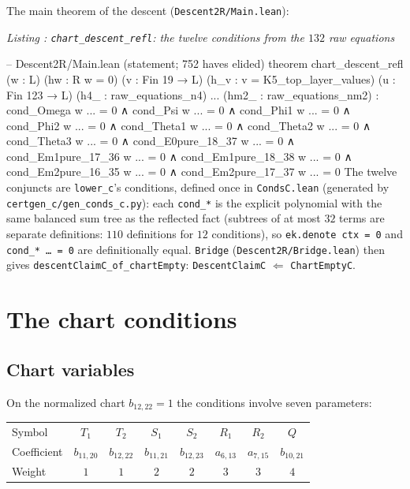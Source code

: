 \documentclass[a4paper,11pt]{article}
\newcounter{leanlisting}
\newenvironment{leanlisting}[2]{%
  \refstepcounter{leanlisting}\label{#2}%
  \begin{center}\textit{\small Listing \theleanlisting: #1}\end{center}%
  \Verbatim[breaklines=true,breakanywhere=true,fontsize=\footnotesize,frame=single,framesep=4pt,rulecolor=\color{gray!50},fillcolor=\color{gray!5}]%
}{%
  \endVerbatim%
}
\theoremstyle{plain}
\theoremstyle{definition}
\theoremstyle{remark}
\begin{document}
The main theorem of the descent (\texttt{Descent2R/Main.lean}):
\begin{leanlisting}{\texttt{chart\_descent\_refl}: the twelve conditions from the $132$ raw equations}{bc:lst:descent}
-- Descent2R/Main.lean (statement; 752 haves elided)
theorem chart_descent_refl
  (w : L) (hw : R w = 0)
  (v : Fin 19 → L) (h_v : v = K5_top_layer_values)
  (u : Fin 123 → L)
  (h4_ : raw_equations_n4) ... (hm2_ : raw_equations_nm2) :
  cond_Omega w ... = 0 ∧ cond_Psi w ... = 0 ∧
  cond_Phi1 w ... = 0 ∧ cond_Phi2 w ... = 0 ∧
  cond_Theta1 w ... = 0 ∧ cond_Theta2 w ... = 0 ∧ cond_Theta3 w ... = 0 ∧
  cond_E0pure_18_37 w ... = 0 ∧ cond_Em1pure_17_36 w ... = 0 ∧
  cond_Em1pure_18_38 w ... = 0 ∧ cond_Em2pure_16_35 w ... = 0 ∧
  cond_Em2pure_17_37 w ... = 0
\end{leanlisting}
The twelve conjuncts are \texttt{lower\_c}'s conditions, defined once in \texttt{CondsC.lean} (generated by \texttt{certgen\_c/}\linebreak\texttt{gen\_conds\_c.py}): each \texttt{cond\_*} is the explicit polynomial with the same balanced sum tree as the reflected fact (subtrees of at most $32$ terms are separate definitions: $110$ definitions for $12$ conditions), so \texttt{ek.denote ctx = 0} and \texttt{cond\_* \dots\ = 0} are definitionally equal. \texttt{Bridge} (\texttt{Descent2R/Bridge.lean}) then gives \texttt{descentClaimC\_of\_chartEmpty}: \texttt{DescentClaimC} $\Leftarrow$ \texttt{ChartEmptyC}.

\section{The chart conditions}\label{bc:sec:conditions}

\subsection{Chart variables}

On the normalized chart $b_{12,22}=1$ the conditions involve seven parameters:

\begin{center}
\begin{tabular}{lccccccc}
\toprule
Symbol & $T_1$ & $T_2$ & $S_1$ & $S_2$ & $R_1$ & $R_2$ & $Q$ \\
Coefficient & $b_{11,20}$ & $b_{12,22}$ & $b_{11,21}$ & $b_{12,23}$ & $a_{6,13}$ & $a_{7,15}$ & $b_{10,21}$ \\
Weight & $1$ & $1$ & $2$ & $2$ & $3$ & $3$ & $4$ \\
\bottomrule
\end{tabular}
\end{center}
\end{document}
